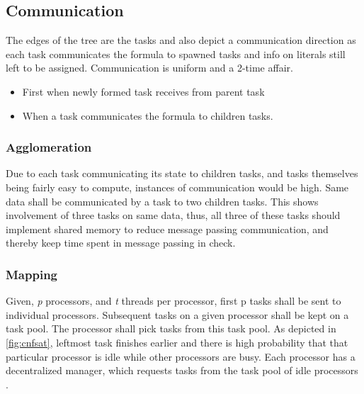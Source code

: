 \documentclass[a4paper]{article}
\begin{document}
\subsection*{Communication}
The edges of the tree are the tasks and also depict a communication direction as each task communicates the formula to spawned tasks and info on literals still left to be assigned. Communication is uniform and a 2-time affair.
\begin{itemize}
\item{} First when newly formed task receives from parent task
\item{} When a task communicates the formula to children tasks.
\end{itemize}
\subsubsection*{Agglomeration}
Due to each task communicating its state to children tasks, and tasks themselves being fairly easy to compute, instances of communication would be high. Same data shall be communicated by a task to two children tasks. This shows involvement of three tasks on same data, thus, all three of these tasks should implement shared memory to reduce message passing communication, and thereby keep time spent in message passing in check.
\subsubsection*{Mapping}
Given, \emph{p} processors, and \emph{t} threads per processor, first p tasks shall be sent to individual processors. Subsequent tasks on a given processor shall be kept on a task pool. The processor shall pick tasks from this task pool. As depicted in \ref{fig:cnfsat}, leftmost task finishes earlier and there is high probability that that particular processor is idle while other processors are busy. Each processor has a decentralized manager, which requests tasks from the task pool of idle processors \cite{foster}.


\end{document}
